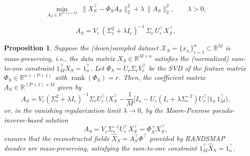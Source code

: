 \documentclass[10pt,a4paper]{amsart}
\newtheorem{prop}{Proposition}
\begin{document}
\begin{equation}\label{eq:obj-row}
\min_{A_S\in\mathbb{R}^{P+1\times M}} \; 
\big\|X^{\top}_S - \Phi_S A_S \big\|_2^2 + \lambda\,\|A_S\|_2^2,
\qquad \lambda>0,
\end{equation}

\begin{equation}
A_S=V_r\,(\Sigma_r^{2}+\lambda I_r)^{-1}\,\Sigma_r\, U_r^{\top} X_S^{\top},
\label{eq:TikhSVD}
\end{equation}

\begin{prop} \label{prp:RANDSMAP}
Suppose the (down)sampled dataset $\mathcal{X}_S=\{x_{s_i}\}_{i=1}^n\subset\mathbb{R}^M$ is mass-preserving, i.e., the data matrix $X_S \in \mathbb{R}^{M \times n}$ satisfies the (normalized) sum-to-one constraint $1_M^\top X_S = 1_n^\top$. Let $\Phi_S = U_r\Sigma_r V_r^\top$ be the SVD of the feature matrix $\Phi_S\in\mathbb{R}^{n\times (P+1)}$ with $\operatorname{rank}(\Phi_S)=r$. Then, the coefficient matrix $A_S\in\mathbb{R}^{(P+1)\times M}$ given by 
\begin{equation}
A_S=V_r(\Sigma^2_r+\lambda I_r)^{-1}\Sigma_r U^{\top}_r\big(X^{\top}_S-\frac{1}{M}\big[I_n-U_r(I_r + \lambda \Sigma^{-2}_r)U^{\top}_r\big]1_n\,1_M^\top\big),
    \label{eq:ShurAfinal0}
\end{equation}
or, in the vanishing regularization limit $\lambda \to 0$, by the Moore-Penrose pseudo-inverse-based solution
\begin{equation} A_S=V_r\Sigma^{-1}_rU^{\top}_rX^{\top}_S=\Phi_S^{+}X^{\top}_S,
    \label{eq:ShurAfinal0s}
\end{equation}
ensures that the reconstructed fields $\widehat{X}_S = A^{\top}_S \Phi^\top$ provided by RANDSMAP decoder are mass-preserving, satisfying the sum-to-one constraint $1_M^\top\widehat{X}_S=1_n^\top$.
\end{prop}
\end{document}
